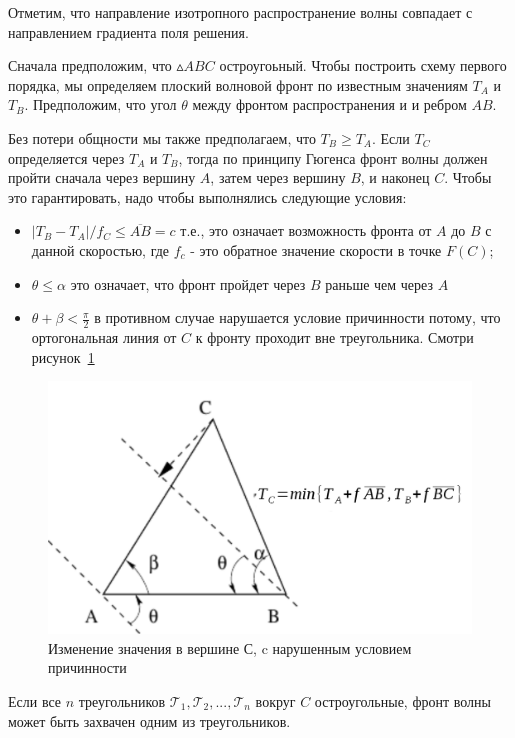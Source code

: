 \documentclass[a4paper,12pt]{article}
\begin{document}
Отметим, что направление изотропного распространение волны совпадает с
направлением градиента поля решения.

Сначала предположим, что $\vartriangle ABC$ остроугоьный. Чтобы
построить схему первого порядка, мы определяем плоский волновой фронт
по известным значениям $T_A$ и $T_B$. Предположим, что угол $\theta$
между фронтом распространения и и ребром $AB$.

Без потери общности мы также предполагаем, что $T_B \ge T_A$. Если
$T_C$ определяется через $T_A$ и $T_B$, тогда по принципу Гюгенса
фронт волны должен пройти сначала через вершину $A$, затем через
вершину $B$, и наконец $C$. Чтобы это гарантировать, надо чтобы
выполнялись следующие условия:
\begin{itemize}
\item $|T_B-T_A| / f_C \le \overline{AB} = c$ т.е., это означает
  возможность фронта от $A$ до $B$ с данной скоростью, где $f_c$ - это
  обратное значение скорости в точке $F(C)$;
\item $\theta \le \alpha$ это означает, что фронт пройдет через $B$
  раньше чем через $A$
\item $\theta + \beta < \frac{\pi}{2}$ в противном случае нарушается
  условие причинности потому, что ортогональная линия от $C$ к фронту
  проходит вне треугольника. Смотри рисунок~\ref{fig:triangle-front}
\end{itemize}

\begin{figure}[H]
  \centering
  \includegraphics[width=0.7\linewidth]{img/triangle-front.png}
  \hfil \caption{Изменение значения в вершине С, c нарушенным условием
  причинности}
  \label{fig:triangle-front}

\end{figure}

Если все $n$ треугольников
$\mathcal{T}_1,\mathcal{T}_2,...,\mathcal{T}_n$ вокруг $C$
остроугольные, фронт волны может быть захвачен одним из треугольников.
\end{document}
